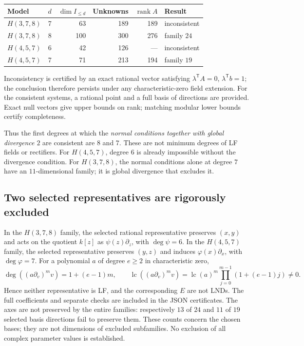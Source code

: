\begin{center}\small
\begin{tabular}{@{}lrrrrl@{}}\toprule
Model & $d$ & $\dim I_{\le d}$ & Unknowns & $\operatorname{rank}A$ & Result\\\midrule
$H(3,7,8)$ &7&63&189&189&inconsistent\\
$H(3,7,8)$ &8&100&300&276&family $24$\\
$H(4,5,7)$ &6&42&126&---&inconsistent\\
$H(4,5,7)$ &7&71&213&194&family $19$\\\bottomrule
\end{tabular}
\end{center}
Inconsistency is certified by an exact rational vector satisfying
$\lambda^{\mathsf T}A=0$, $\lambda^{\mathsf T}b=1$; the conclusion therefore
persists under any characteristic-zero field extension.
For the consistent systems, a rational point and a full basis of
directions are provided. Exact null vectors give upper bounds on rank;
matching modular lower bounds certify completeness.

Thus the first degrees at which the \emph{normal conditions together
with global divergence $2$} are consistent are $8$ and $7$.
These are not minimum degrees of LF fields or rectifiers.
For $H(4,5,7)$, degree $6$ is already impossible without the divergence condition.
For $H(3,7,8)$, the normal conditions alone at degree $7$ have
an $11$-dimensional family; it is global divergence that excludes it.

\subsection{Two selected representatives are rigorously excluded}
In the $H(3,7,8)$ family, the selected rational representative preserves
$(x,y)$ and acts on the quotient $k[z]$ as $\psi(z)\partial_z$,
with $\deg\psi=6$. In the $H(4,5,7)$ family, the selected representative preserves
$(y,z)$ and induces $\varphi(x)\partial_x$, with $\deg\varphi=7$.
For a polynomial $a$ of degree $e\ge2$ in characteristic zero,
\[
\deg((a\partial_v)^m v)=1+(e-1)m,\qquad
\operatorname{lc}((a\partial_v)^m v)
=\operatorname{lc}(a)^m\prod_{j=0}^{m-1}(1+(e-1)j)\ne0.
\]
Hence neither representative is LF, and the corresponding $E$ are not LNDs.
The full coefficients and separate checks are included in the JSON certificates.
The axes are not preserved by the entire families: respectively $13$ of $24$ and
$11$ of $19$ selected basis directions fail to preserve them.
These counts concern the chosen bases; they are not dimensions of
excluded subfamilies. No exclusion of all complex parameter values is established.

